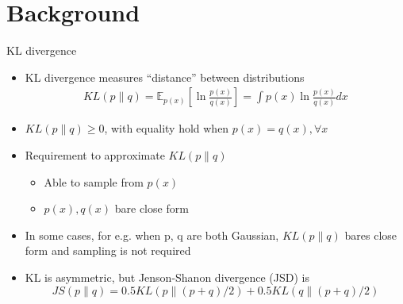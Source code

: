 \documentclass[compress]{beamer}
\newcommand{\expects}[2]{\mathbb{E}_{#1} \left[ #2 \right]}
\begin{document}
\section{Background}
\begin{frame}{KL divergence}
    \begin{itemize}
        \item KL divergence measures ``distance'' between distributions
            \begin{align*}
                KL(p\|q) = \expects{p(x)}{\ln \frac{p(x)}{q(x)} } = \int p(x) \ln \frac{p(x)}{q(x)} dx 
            \end{align*}
        \item $KL(p\|q)\ge 0$, with equality hold when $p(x)=q(x), \forall x$
        \item Requirement to approximate $KL(p\|q)$
            \begin{itemize}
                \item Able to sample from $p(x)$
                \item $p(x), q(x)$ bare close form
            \end{itemize}
        \item In some cases, for e.g. when p, q are both Gaussian, $KL(p\|q)$ bares close form and sampling is not required
        \item KL is asymmetric, but Jenson-Shanon divergence (JSD) is
            \begin{equation*}
                JS(p\|q) = 0.5KL(p\|(p+q)/2) + 0.5KL(q\|(p+q)/2)
            \end{equation*}
    \end{itemize}
\end{frame}
\end{document}
